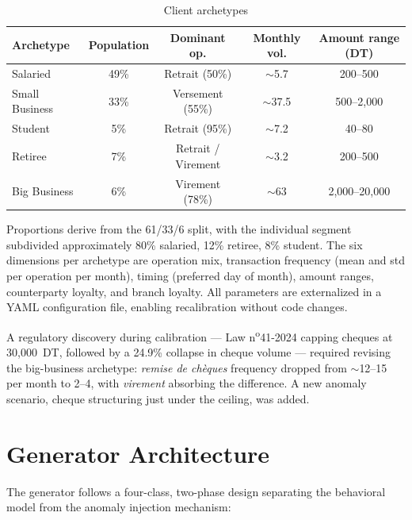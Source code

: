 \begin{table}[htbp]
\centering
\small
\caption{Client archetypes}
\begin{tabular}{@{}lcccc@{}}
\toprule
\textbf{Archetype} & \textbf{Population} & \textbf{Dominant op.} & \textbf{Monthly vol.} & \textbf{Amount range (DT)} \\
\midrule
Salaried & 49\% & Retrait (50\%) & $\sim$5.7 & 200--500 \\
Small Business & 33\% & Versement (55\%) & $\sim$37.5 & 500--2{,}000 \\
Student & 5\% & Retrait (95\%) & $\sim$7.2 & 40--80 \\
Retiree & 7\% & Retrait / Virement & $\sim$3.2 & 200--500 \\
Big Business & 6\% & Virement (78\%) & $\sim$63 & 2{,}000--20{,}000 \\
\bottomrule
\end{tabular}
\end{table}

Proportions derive from the 61/33/6 split, with the individual segment subdivided approximately 80\% salaried, 12\% retiree, 8\% student. The six dimensions per archetype are operation mix, transaction frequency (mean and std per operation per month), timing (preferred day of month), amount ranges, counterparty loyalty, and branch loyalty. All parameters are externalized in a YAML configuration file, enabling recalibration without code changes.

A regulatory discovery during calibration --- Law n\textsuperscript{o}41-2024 capping cheques at 30{,}000~DT, followed by a 24.9\% collapse in cheque volume --- required revising the big-business archetype: \emph{remise de ch\`eques} frequency dropped from $\sim$12--15 per month to 2--4, with \emph{virement} absorbing the difference. A new anomaly scenario, cheque structuring just under the ceiling, was added.

\section{Generator Architecture}

The generator follows a four-class, two-phase design separating the behavioral model from the anomaly injection mechanism:

